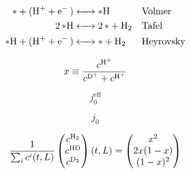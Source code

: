 \documentclass{article}
\begin{document}
	\begin{align}
	\ce{$*$ + (H+ + e- ) &<-> $*$H} &&\text{Volmer}\\
	\ce{2 $*$H &<-> 2$*$ + H2} &&\text{Tafel}\\
	\ce{$*$H + (H+ + e- ) &<-> $*$ + H2} &&\text{Heyrovsky}\\
	\end{align}
	
	\begin{equation}
	x \equiv \frac{c^{\ce{H+}}}{c^{\ce{D+}} + c^{\ce{H+}}}
	\end{equation}
	
	\begin{equation}
	j_0^{\text{eff}}
	\end{equation}
	
	\begin{equation}
	j_0
	\end{equation}
	
	\begin{equation}
	\frac{1}{\sum_i c^i(t, L)}\begin{pmatrix}
	c^{\ce{H2}}\\c^{\ce{HD}}\\c^{\ce{D2}}
	\end{pmatrix}(t, L)
	= \begin{pmatrix}
	x^2\\ 2x(1-x)\\ (1-x)^2
	\end{pmatrix}
	\end{equation}
	
\end{document}
